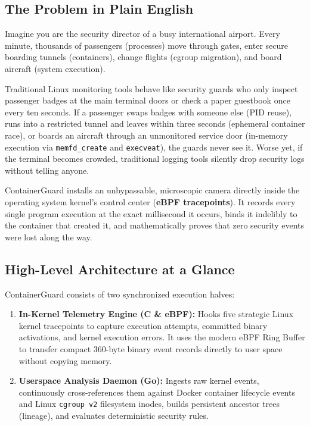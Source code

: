 \documentclass[11pt,a4paper]{article}
\begin{document}
\subsection{The Problem in Plain English}
Imagine you are the security director of a busy international airport. 
Every minute, thousands of passengers (processes) move through gates, enter secure boarding tunnels (containers), change flights (cgroup migration), and board aircraft (system execution). 

Traditional Linux monitoring tools behave like security guards who only inspect passenger badges at the main terminal doors or check a paper guestbook once every ten seconds. 
If a passenger swaps badges with someone else (PID reuse), runs into a restricted tunnel and leaves within three seconds (ephemeral container race), or boards an aircraft through an unmonitored service door (in-memory execution via \texttt{memfd\_create} and \texttt{execveat}), the guards never see it. 
Worse yet, if the terminal becomes crowded, traditional logging tools silently drop security logs without telling anyone.

\begin{conceptbox}
ContainerGuard installs an unbypassable, microscopic camera directly inside the operating system kernel's control center (\textbf{eBPF tracepoints}). It records every single program execution at the exact millisecond it occurs, binds it indelibly to the container that created it, and mathematically proves that zero security events were lost along the way.
\end{conceptbox}

\subsection{High-Level Architecture at a Glance}
ContainerGuard consists of two synchronized execution halves:
\begin{enumerate}
    \item \textbf{In-Kernel Telemetry Engine (C \& eBPF):} Hooks five strategic Linux kernel tracepoints to capture execution attempts, committed binary activations, and kernel execution errors. It uses the modern eBPF Ring Buffer to transfer compact 360-byte binary event records directly to user space without copying memory.
    \item \textbf{Userspace Analysis Daemon (Go):} Ingests raw kernel events, continuously cross-references them against Docker container lifecycle events and Linux \texttt{cgroup v2} filesystem inodes, builds persistent ancestor trees (lineage), and evaluates deterministic security rules.
\end{enumerate}
\end{document}
